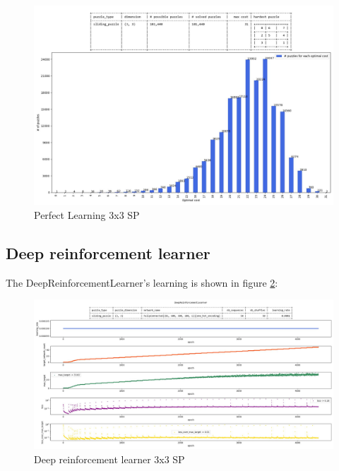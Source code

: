 \begin{landscape}
\centering\vspace*{\fill}
\begin{figure}[H]
\centering
\includegraphics[scale=0.7]{./Figures/33SPPerfectLearning.jpeg}
\caption[33SPPerfectLearning]{Perfect Learning 3x3 SP}
\label{fig:33SPPerfectLearning}
\end{figure}
\vfill
\end{landscape}
\restoregeometry




\subsection{Deep reinforcement learner}
 The DeepReinforcementLearner's learning is shown in figure \ref{fig:33SPDeepReinforcementLearning}:

\begin{landscape}
\centering\vspace*{\fill}
\begin{figure}[H]
\centering
\includegraphics[align=c, scale=0.55]{./Figures/33SPDeepReinforcementLearning.jpeg}
\caption[33SPDeepReinforcementLearning]{Deep reinforcement learner 3x3 SP}
\label{fig:33SPDeepReinforcementLearning}
\end{figure}
\vfill
\end{landscape}
\restoregeometry


